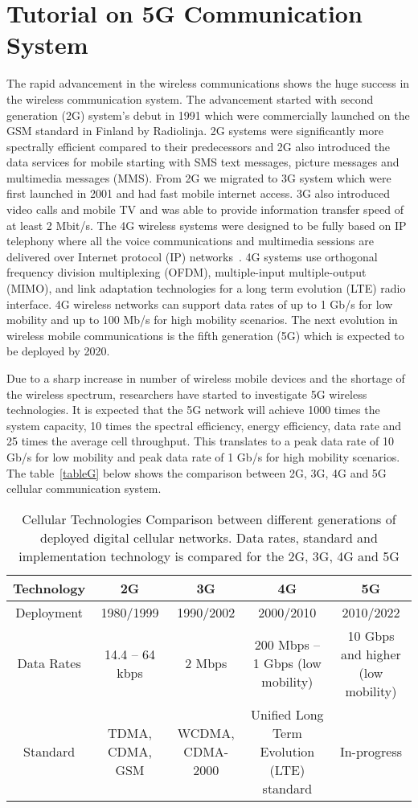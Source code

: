 \chapter{Tutorial on 5G Communication System}
\label{chapter2}
The rapid advancement in the wireless communications shows the huge success in the wireless communication system. The advancement started with second generation (2G) system's debut in 1991 which were commercially launched on the GSM standard in Finland by Radiolinja. 2G systems were significantly more spectrally efficient compared to their predecessors and 2G also introduced the data services for mobile starting with SMS text messages, picture messages and multimedia messages (MMS). From 2G we migrated to 3G system which were first launched in 2001 and had fast mobile internet access. 3G also introduced video calls and mobile TV and was able to provide information transfer speed of at least 2 Mbit/s. The 4G wireless systems were designed to be fully based on IP telephony where all the voice communications and multimedia sessions are delivered over Internet protocol (IP) networks~\cite{4561570}. 4G systems use orthogonal frequency division multiplexing (OFDM), multiple-input multiple-output (MIMO), and link adaptation technologies for a long term evolution (LTE) radio interface. 4G wireless networks can support data rates of up to 1 Gb/s for low mobility and up to 100 Mb/s for high mobility scenarios. The next evolution in wireless mobile communications is the fifth generation (5G) which is expected to be deployed by 2020.

Due to a sharp increase in number of wireless mobile devices and the shortage of the wireless spectrum, researchers have started to investigate 5G wireless technologies. It is expected that the 5G network will achieve 1000 times the system capacity, 10 times the spectral efficiency, energy efficiency, data rate and 25 times the average cell throughput. This translates to a peak data rate of 10 Gb/s for low mobility and peak data rate of 1 Gb/s for high mobility scenarios. The table~\ref{tableG} below shows the comparison between 2G, 3G, 4G and 5G cellular communication system. 
\begin{table}[!ht]
\centering
\caption{Cellular Technologies Comparison between different generations of deployed digital cellular networks. Data rates, standard and implementation technology is compared for the 2G, 3G, 4G and 5G}
\begin{tabular}{| c | c | c | c | c |}
\hline
\textbf{Technology} & \textbf{2G} & \textbf{3G} & \textbf{4G} & \textbf{5G} \\
\hline
Deployment & 1980/1999 & 1990/2002 & 2000/2010 & 2010/2022 \\
\hline
Data Rates & 14.4 -- 64 kbps & 2 Mbps & 200 Mbps -- 1 Gbps (low mobility) & 10 Gbps and higher (low mobility) \\
\hline
Standard & TDMA, CDMA, GSM & WCDMA, CDMA-2000 & Unified Long Term Evolution (LTE) standard & In-progress \\
\hline
\end{tabular}
\end{table}





